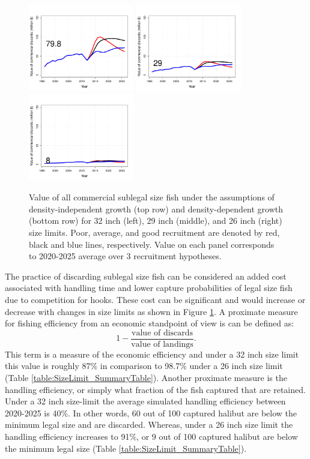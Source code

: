 \begin{figure}[htbp]
		\includegraphics[height=1.5in]{../FIGURES/SIZELIMIT/fig_32_DD_DVal.pdf}
		\includegraphics[height=1.5in]{../FIGURES/SIZELIMIT/fig_29_DD_DVal.pdf}
		\includegraphics[height=1.5in]{../FIGURES/SIZELIMIT/fig_26_DD_DVal.pdf}
	\caption{Value of all commercial sublegal size fish under the assumptions of density-independent growth (top row) and density-dependent growth (bottom row) for 32 inch (left), 29 inch (middle), and 26 inch (right) size limits.  Poor, average, and good recruitment are denoted by red, black and blue lines, respectively.  Value on each panel corresponds to 2020-2025 average over 3 recruitment hypotheses.}
	\label{fig:FIGURES_SIZELIMIT_fig_32_DI_DVal}
\end{figure}

The practice of discarding sublegal size fish can be considered an added cost associated with handling time and lower capture probabilities of legal size fish due to competition for hooks.  These cost can be significant and would increase or decrease with changes in size limits as shown in Figure \ref{fig:FIGURES_SIZELIMIT_fig_32_DI_DVal}.  A proximate measure for fishing efficiency from an economic standpoint of view is can be defined as:
\[1-\frac{\mbox{value of discards}}{\mbox{value of landings}}.\]
This term is a measure of the economic efficiency and under a 32 inch size limit this value is roughly 87\% in comparison to 98.7\% under a 26 inch size limit (Table \ref{table:SizeLimit_SummaryTable}).  Another proximate measure is the handling efficiency, or simply what fraction of the fish captured that are retained.  Under  a 32 inch size-limit the average simulated handling efficiency between 2020-2025 is 40\%.  In other words, 60 out of 100 captured halibut are below the minimum legal size and are discarded.  Whereas, under a 26 inch size limit the handling efficiency increases to 91\%, or 9 out of 100 captured halibut are below the minimum legal size (Table \ref{table:SizeLimit_SummaryTable}).


